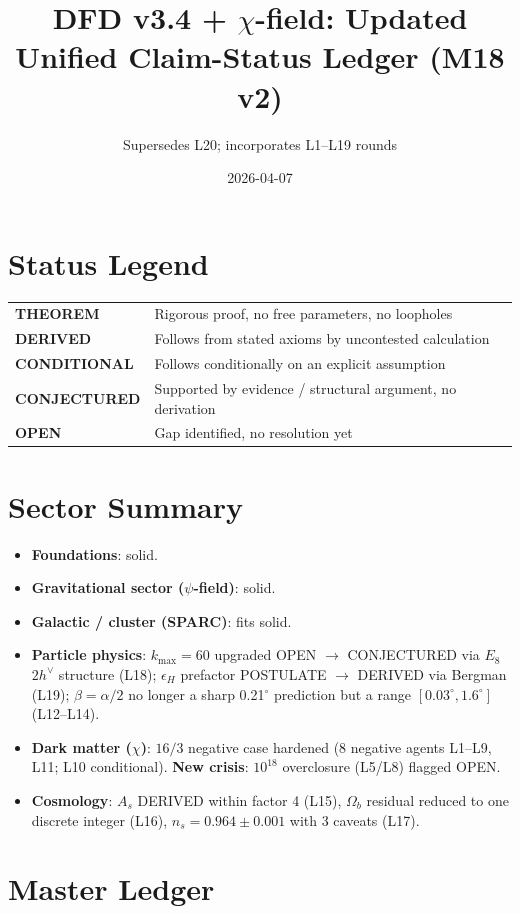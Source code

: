 \documentclass[11pt]{article}
\title{DFD v3.4 + $\chi$-field: Updated Unified Claim-Status Ledger (M18 v2)}
\author{Supersedes L20; incorporates L1--L19 rounds}
\date{2026-04-07}
\newcommand{\THM}{\textcolor{thmcol}{\textbf{THEOREM}}}
\newcommand{\DER}{\textcolor{dercol}{\textbf{DERIVED}}}
\newcommand{\CON}{\textcolor{condcol}{\textbf{CONDITIONAL}}}
\newcommand{\CNJ}{\textcolor{conjcol}{\textbf{CONJECTURED}}}
\newcommand{\OPN}{\textcolor{opencol}{\textbf{OPEN}}}
\begin{document}
\maketitle

\section*{Status Legend}
\begin{tabular}{ll}
\THM     & Rigorous proof, no free parameters, no loopholes \\
\DER     & Follows from stated axioms by uncontested calculation \\
\CON     & Follows conditionally on an explicit assumption \\
\CNJ     & Supported by evidence / structural argument, no derivation \\
\OPN     & Gap identified, no resolution yet \\
\end{tabular}

\section*{Sector Summary}
\begin{itemize}\itemsep1pt
  \item \textbf{Foundations}: solid.
  \item \textbf{Gravitational sector ($\psi$-field)}: solid.
  \item \textbf{Galactic / cluster (SPARC)}: fits solid.
  \item \textbf{Particle physics}: $k_{\max}{=}60$ upgraded OPEN $\to$ CONJECTURED via $E_8$ $2h^\vee$ structure (L18); $\epsilon_H$ prefactor POSTULATE $\to$ DERIVED via Bergman (L19); $\beta=\alpha/2$ no longer a sharp 0.21$^\circ$ prediction but a range $[0.03^\circ, 1.6^\circ]$ (L12--L14).
  \item \textbf{Dark matter ($\chi$)}: $16/3$ negative case hardened (8 negative agents L1--L9, L11; L10 conditional). \textbf{New crisis}: $10^{18}$ overclosure (L5/L8) flagged OPEN.
  \item \textbf{Cosmology}: $A_s$ DERIVED within factor 4 (L15), $\Omega_b$ residual reduced to one discrete integer (L16), $n_s = 0.964 \pm 0.001$ with 3 caveats (L17).
\end{itemize}

\section*{Master Ledger}
\end{document}
